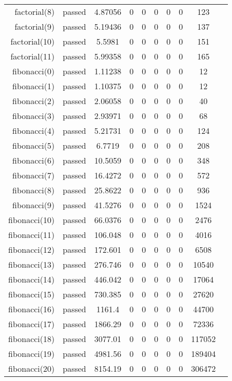 \begin{longtable}{r|ccccccccc}
    factorial(8) & passed & 4.87056 & 0 & 0 & 0 & 0 & 0 & 123 \\
    factorial(9) & passed & 5.19436 & 0 & 0 & 0 & 0 & 0 & 137 \\
    factorial(10) & passed & 5.5981 & 0 & 0 & 0 & 0 & 0 & 151 \\
    factorial(11) & passed & 5.99358 & 0 & 0 & 0 & 0 & 0 & 165 \\
    fibonacci(0) & passed & 1.11238 & 0 & 0 & 0 & 0 & 0 & 12 \\
    fibonacci(1) & passed & 1.10375 & 0 & 0 & 0 & 0 & 0 & 12 \\
    fibonacci(2) & passed & 2.06058 & 0 & 0 & 0 & 0 & 0 & 40 \\
    fibonacci(3) & passed & 2.93971 & 0 & 0 & 0 & 0 & 0 & 68 \\
    fibonacci(4) & passed & 5.21731 & 0 & 0 & 0 & 0 & 0 & 124 \\
    fibonacci(5) & passed & 6.7719 & 0 & 0 & 0 & 0 & 0 & 208 \\
    fibonacci(6) & passed & 10.5059 & 0 & 0 & 0 & 0 & 0 & 348 \\
    fibonacci(7) & passed & 16.4272 & 0 & 0 & 0 & 0 & 0 & 572 \\
    fibonacci(8) & passed & 25.8622 & 0 & 0 & 0 & 0 & 0 & 936 \\
    fibonacci(9) & passed & 41.5276 & 0 & 0 & 0 & 0 & 0 & 1524 \\
    fibonacci(10) & passed & 66.0376 & 0 & 0 & 0 & 0 & 0 & 2476 \\
    fibonacci(11) & passed & 106.048 & 0 & 0 & 0 & 0 & 0 & 4016 \\
    fibonacci(12) & passed & 172.601 & 0 & 0 & 0 & 0 & 0 & 6508 \\
    fibonacci(13) & passed & 276.746 & 0 & 0 & 0 & 0 & 0 & 10540 \\
    fibonacci(14) & passed & 446.042 & 0 & 0 & 0 & 0 & 0 & 17064 \\
    fibonacci(15) & passed & 730.385 & 0 & 0 & 0 & 0 & 0 & 27620 \\
    fibonacci(16) & passed & 1161.4 & 0 & 0 & 0 & 0 & 0 & 44700 \\
    fibonacci(17) & passed & 1866.29 & 0 & 0 & 0 & 0 & 0 & 72336 \\
    fibonacci(18) & passed & 3077.01 & 0 & 0 & 0 & 0 & 0 & 117052 \\
    fibonacci(19) & passed & 4981.56 & 0 & 0 & 0 & 0 & 0 & 189404 \\
    fibonacci(20) & passed & 8154.19 & 0 & 0 & 0 & 0 & 0 & 306472 \\

\end{longtable}
